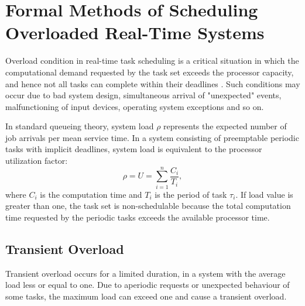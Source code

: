 \chapter{Formal Methods of Scheduling Overloaded Real-Time Systems}
Overload condition in real-time task scheduling is a critical situation in which the computational demand requested by the task set exceeds the processor capacity, and hence not all tasks can complete within their deadlines 
\cite{lee2007handbook}.
Such conditions may occur due to bad system design, simultaneous arrival of "unexpected" events, malfunctioning of input devices, operating system exceptions and so on.

In standard queueing theory, system load $\rho$ represents the expected number of job arrivals per mean service time. 
In a system consisting of preemptable periodic tasks with implicit deadlines, system load is equivalent to the processor utilization factor:
\begin{equation*}
\rho = U = \sum_{i=1}^{n}\frac{C_i}{T_i},
\end{equation*}
where $C_i$ is the computation time and $T_i$ is the period of task $\tau_i$.
If load value is greater than one, the task set is non-schedulable because the total computation time requested by the periodic tasks exceeds the available processor time.


\section{Transient Overload}
Transient overload occurs for a limited duration, in a system with the average load less or equal to one.
Due to aperiodic requests or unexpected behaviour of some tasks, the maximum load can exceed one and cause a transient overload.

